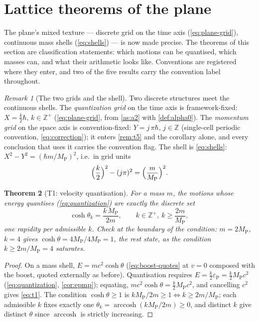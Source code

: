 \documentclass[11pt]{amsbook}
\theoremstyle{plain}
\newtheorem{theorem}{Theorem}[chapter]
\theoremstyle{definition}
\theoremstyle{remark}
\newtheorem{remark}[theorem]{Remark}
\newcommand{\uses}[1]{\par\nopagebreak\noindent{\footnotesize\emph{Uses: #1.}\par}}
\begin{document}
\section{Lattice theorems of the plane}\label{sec:lattice-theorems}

The plane's mixed texture --- discrete grid on the time axis (\cref{eq:plane-grid}), continuous mass shells (\cref{eq:shells}) --- is now made precise. The theorems of this section are classification statements: which motions can be quantised, which masses can, and what their arithmetic looks like. Conventions are registered where they enter, and two of the five results carry the convention label throughout.

\begin{remark}[The two grids and the shell]\label{rem:two-grids}
Two discrete structures meet the continuous shells. The \emph{quantization grid} on the time axis is framework-fixed: $X = \tfrac{k}{2}\hbar$, $k \in \mathbb{Z}^{+}$ (\cref{eq:plane-grid}, from \cref{as:a2} with \cref{def:alpha0}). The \emph{momentum grid} on the space axis is convention-fixed: $Y = j\,\pi\hbar$, $j \in \mathbb{Z}$ (single-cell periodic convention, \cref{eq:correction}); it enters \cref{rem:t5} and the corollary alone, and every conclusion that uses it carries the convention flag. The shell is \cref{eq:shells}: $X^{2} - Y^{2} = (\hbar m/M_{\mathrm P})^{2}$, i.e.\ in grid units
\begin{equation}\label{eq:shell-units}
\Bigl(\frac{k}{2}\Bigr)^{2} - (j\pi)^{2} = \Bigl(\frac{m}{M_{\mathrm P}}\Bigr)^{2}.
\end{equation}
\end{remark}

\begin{theorem}[T1: velocity quantisation]\label{thm:t1}
For a mass $m$, the motions whose energy quantises (\cref{eq:quantization}) are exactly the discrete set
\begin{equation}\label{eq:t1}
\cosh\theta_{k} = \frac{k\,M_{\mathrm P}}{2m}, \qquad k \in \mathbb{Z}^{+},\ k \geq \frac{2m}{M_{\mathrm P}},
\end{equation}
one rapidity per admissible $k$. Check at the boundary of the condition: $m = 2M_{\mathrm P}$, $k = 4$ gives $\cosh\theta = 4M_{\mathrm P}/4M_{\mathrm P} = 1$, the rest state, as the condition $k \geq 2m/M_{\mathrm P} = 4$ saturates.
\uses{\cref{eq:quantization}, \cref{thm:bilateral}}
\end{theorem}

\begin{proof}
On a mass shell, $E = mc^{2}\cosh\theta$ (\cref{eq:boost-quotes} at $v = 0$ composed with the boost, quoted externally as before). Quantisation requires $E = \tfrac{k}{2}\varepsilon_{\mathrm P} = \tfrac{k}{2}M_{\mathrm P}c^{2}$ (\cref{eq:quantization}, \cref{cor:epmp}); equating, $mc^{2}\cosh\theta = \tfrac{k}{2}M_{\mathrm P}c^{2}$, and cancelling $c^{2}$ gives \cref{eq:t1}. The condition $\cosh\theta \geq 1$ is $kM_{\mathrm P}/2m \geq 1 \Leftrightarrow k \geq 2m/M_{\mathrm P}$; each admissible $k$ fixes exactly one $\theta_{k} = \operatorname{arccosh}(kM_{\mathrm P}/2m) \geq 0$, and distinct $k$ give distinct $\theta$ since $\operatorname{arccosh}$ is strictly increasing.
\end{proof}
\end{document}
